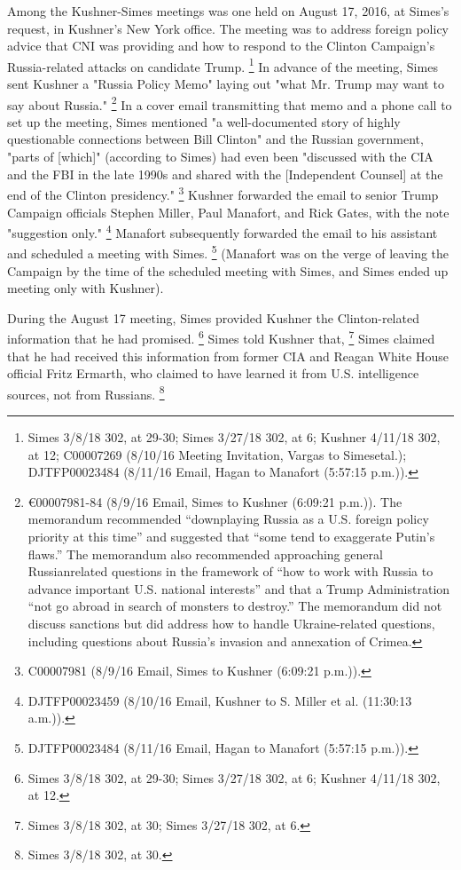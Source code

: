 Among the Kushner-Simes meetings was one held on August 17, 2016, at Simes's request, in Kushner's New York office.
The meeting was to address foreign policy advice that CNI was providing and how to respond to the Clinton Campaign's Russia-related attacks on candidate Trump.%
\footnote{Simes 3/8/18 302, at 29-30; 
Simes 3/27/18 302, at 6; 
Kushner 4/11/18 302, at 12; 
C00007269 (8/10/16 Meeting Invitation, Vargas to Simesetal.); 
DJTFP00023484 (8/11/16 Email, Hagan to Manafort (5:57:15 p.m.)).}
In advance of the meeting, Simes sent Kushner a "Russia Policy Memo" laying out "what Mr. Trump may want to say about Russia."%
\footnote{€00007981-84 (8/9/16 Email, Simes to Kushner (6:09:21 p.m.)). 
The memorandum recommended “downplaying Russia as a U.S. foreign policy priority at this time” and suggested that “some tend to exaggerate Putin’s flaws.” 
The memorandum also recommended approaching general Russianrelated questions in the framework of “how to work with Russia to advance important U.S. national interests” and that a Trump Administration “not go abroad in search of monsters to destroy.” 
The memorandum did not discuss sanctions but did address how to handle Ukraine-related questions, including questions about Russia’s invasion and annexation of Crimea.}
In a cover email transmitting that memo and a phone call to set up the meeting, Simes mentioned "a well-documented story of highly questionable connections between Bill Clinton" and the Russian government, "parts of [which]" (according to Simes) had even been "discussed with the CIA and the FBI in the late 1990s and shared with the [Independent Counsel] at the end of the Clinton presidency."%
\footnote{C00007981 (8/9/16 Email, Simes to Kushner (6:09:21 p.m.)).}
Kushner forwarded the email to senior Trump Campaign officials Stephen Miller, Paul Manafort, and Rick Gates, with the note "suggestion only."%
\footnote{DJTFP00023459 (8/10/16 Email, Kushner to S. Miller et al. (11:30:13 a.m.)).}
Manafort subsequently forwarded the email to his assistant and scheduled a meeting with Simes.%
\footnote{DJTFP00023484 (8/11/16 Email, Hagan to Manafort (5:57:15 p.m.)).}
(Manafort was on the verge of leaving the Campaign by the time of the scheduled meeting with Simes, and Simes ended up meeting only with Kushner).

During the August 17 meeting, Simes provided Kushner the Clinton-related information that he had promised.%
\footnote{Simes 3/8/18 302, at 29-30; 
Simes 3/27/18 302, at 6; 
Kushner 4/11/18 302, at 12.}
Simes told Kushner that,
\footnote{Simes 3/8/18 302, at 30; 
Simes 3/27/18 302, at 6.}
Simes claimed that he had received this information from former CIA and Reagan White House official Fritz Ermarth, who claimed to have learned it from U.S. intelligence sources, not from Russians.%
\footnote{Simes 3/8/18 302, at 30.}

